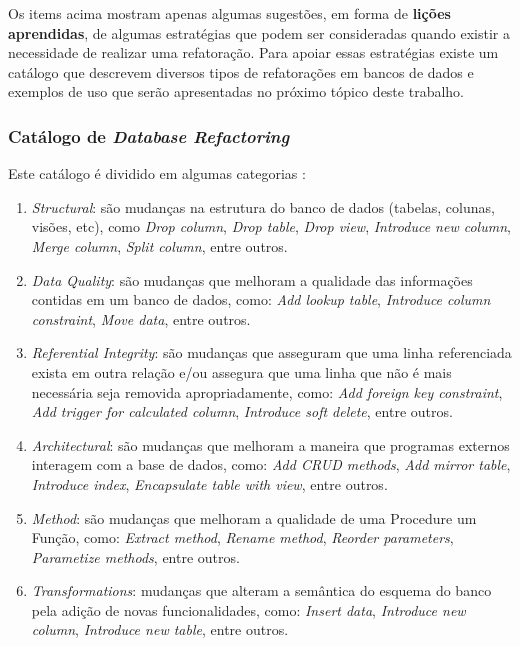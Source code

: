 \documentclass[10pt]{article}
\begin{document}
	Os items acima mostram apenas algumas sugestões, em forma de \textbf{lições aprendidas}, de algumas estratégias que podem ser consideradas quando existir a necessidade de realizar uma refatoração. Para apoiar essas estratégias existe um catálogo que descrevem diversos tipos de refatorações em bancos de dados e exemplos de uso que serão apresentadas no próximo tópico deste trabalho.

\subsubsection{Catálogo de \textit{Database Refactoring}}\label{subsec:catalogodatabaserefactoring}
	Este catálogo é dividido em algumas categorias \cite{Ambler:RefactoringDatabases}:

	\begin{enumerate}
		\item \textit{Structural}: são mudanças na estrutura do banco de dados (tabelas, colunas, visões, etc), como \textit{Drop column}, \textit{Drop table}, \textit{Drop view}, \textit{Introduce new column}, \textit{Merge column}, \textit{Split column}, entre outros.
		\item \textit{Data Quality}: são mudanças que melhoram a qualidade das informações contidas em um banco de dados, como: \textit{Add lookup table}, \textit{Introduce column constraint}, \textit{Move data}, entre outros.
		\item \textit{Referential Integrity}: são mudanças que asseguram que uma linha referenciada exista em outra relação e/ou assegura que uma linha que não é mais necessária seja removida apropriadamente, como: \textit{Add foreign key constraint}, \textit{Add trigger for calculated column}, \textit{Introduce soft delete}, entre outros.
		\item \textit{Architectural}: são mudanças que melhoram a maneira que programas externos interagem com a base de dados, como: \textit{Add CRUD methods}, \textit{Add mirror table}, \textit{Introduce index}, \textit{Encapsulate table with view}, entre outros.
		\item \textit{Method}: são mudanças que melhoram a qualidade de uma Procedure um Função, como: \textit{Extract method}, \textit{Rename method}, \textit{Reorder parameters}, \textit{Parametize methods}, entre outros.
		\item \textit{Transformations}: mudanças que alteram a semântica do esquema do banco pela adição de novas funcionalidades, como: \textit{Insert data}, \textit{Introduce new column}, \textit{Introduce new table}, entre outros.
	\end{enumerate}
\end{document}
